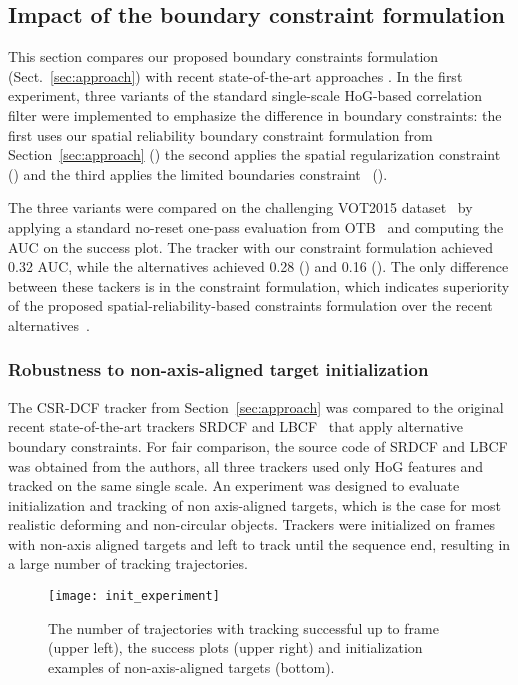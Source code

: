 \documentclass[twocolumn]{article}
\begin{document}
\subsection{Impact of the boundary constraint formulation}  \label{sec:boundary_impact}

This section compares our proposed boundary constraints formulation (Sect.~\ref{sec:approach}) with recent state-of-the-art approaches \citep{srdcf_iccv2015,cfwlb_cvpr2015}. In the first experiment, three variants of the standard single-scale HoG-based correlation filter were implemented to emphasize the difference in boundary constraints: the first uses our spatial reliability boundary constraint formulation from Section~\ref{sec:approach} () the second applies the spatial regularization constraint~\citep{srdcf_iccv2015} () and the third applies the limited boundaries constraint~\citep{cfwlb_cvpr2015} ().

The three variants were compared on the challenging VOT2015 dataset~\citep{kristan_vot2015} by applying a standard no-reset one-pass evaluation from OTB~\citep{otb_cvpr2010} and computing the AUC on the success plot. The tracker with our constraint formulation  achieved 0.32 AUC, while the alternatives achieved 0.28 () and 0.16 (). The only difference between these tackers is in the constraint formulation, which indicates superiority of the proposed spatial-reliability-based constraints formulation over the recent alternatives~\citep{cfwlb_cvpr2015,srdcf_iccv2015}.

\subsubsection{Robustness to non-axis-aligned target initialization}

The CSR-DCF tracker from Section~\ref{sec:approach} was compared to the original recent state-of-the-art trackers SRDCF \citep{srdcf_iccv2015} and LBCF~\citep{cfwlb_cvpr2015} that apply alternative boundary constraints. For fair comparison, the source code of SRDCF and LBCF was obtained from the authors, all three trackers used only HoG features and tracked on the same single scale. An experiment was designed to evaluate initialization and tracking of non axis-aligned targets, which is the case for most realistic deforming and non-circular objects. Trackers were initialized on frames with non-axis aligned targets and left to track until the sequence end, resulting in a large number of tracking trajectories.

\begin{figure}[!t]
\centering
\texttt{[image: init\_experiment]}
\caption{The number of trajectories with tracking successful up to frame  (upper left), the success plots (upper right) and initialization examples of non-axis-aligned targets (bottom).}
\label{fig:init_experiment}
\end{figure}
\end{document}
